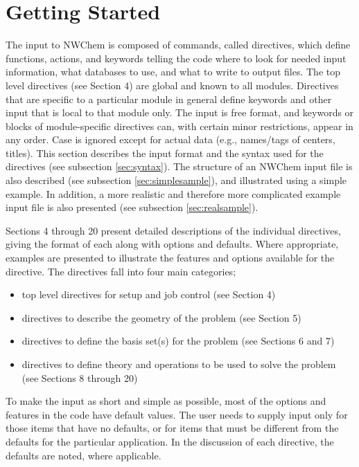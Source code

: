 \section{Getting Started}
\label{sec:getstart}

The input to NWChem is composed of commands, called directives, which define 
functions, actions, and keywords telling the code where to look for needed
input information, what databases to use, and what to write to output files.
The top level directives (see Section 4) are global and known to all modules.
Directives that are specific to a particular module in general define keywords
and other input that is local to that module only.  
The input is free format, and
keywords or blocks of module-specific directives can, with certain
minor restrictions, appear in any order.  Case is ignored except
for actual data (e.g., names/tags of centers, titles).  This section describes
the input format and the syntax used for the directives 
(see subsection \ref{sec:syntax}).
The structure of an NWChem input file is also described (see subsection 
\ref{sec:simplesample}), and  illustrated using a simple example.  In 
addition, a  more realistic and therefore more complicated example input 
file is also presented (see subsection \ref{sec:realsample}).

Sections 4 through 20 present detailed descriptions of the individual
directives, giving the format of each along with options and defaults.  Where
appropriate, examples are presented to illustrate the features and options
available for the directive.  The directives fall into four main categories;

\begin{itemize}
\item top level directives for setup and job control (see Section 4)
\item directives to describe the geometry of the problem (see Section 5)
\item directives to define the basis set(s) for the problem (see Sections 6 and 7)
\item directives to define theory and operations to be used to solve the problem (see Sections 8 through 20)
\end{itemize}

To make the input as short and simple as possible, most of the options and
features in the code have default values.  The user needs to supply input only
for those items that have no defaults, or for items that must be different
from the defaults for the particular application.  In the discussion of each
directive, the defaults are noted, where applicable.

